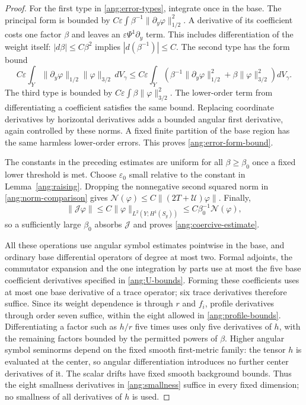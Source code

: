 \begin{proof}
For the first type in \eqref{ang:error-types}, integrate once in the
base.  The principal form is bounded by
$C\varepsilon\int\beta^{-1}\|\partial_y\varphi\|_{1/2}^2$.
A derivative of its coefficient costs one factor $\beta$ and leaves an
$\varepsilon\Psi^1\partial_y$ term.  This includes differentiation of the
weight itself: $|d\beta|\le C\beta^2$ implies
$|d(\beta^{-1})|\le C$.  The second type has the form bound
\[
 C\varepsilon\int_Y
     \|\partial_y\varphi\|_{1/2}\|\varphi\|_{3/2}\,dV_\gamma
 \le C\varepsilon\int_Y\left(
     \beta^{-1}\|\partial_y\varphi\|_{1/2}^2
                 +\beta\|\varphi\|_{3/2}^2\right)dV_\gamma.
\]
The third type is bounded by
$C\varepsilon\int\beta\|\varphi\|_{3/2}^2$.
The lower-order term from differentiating a coefficient satisfies the
same bound.  Replacing coordinate derivatives by horizontal derivatives
adds a bounded angular first derivative, again controlled by these norms.
A fixed finite partition of the base region has the same harmless
lower-order errors.  This proves \eqref{ang:error-form-bound}.

The constants in the preceding estimates are uniform for all
$\beta\ge\beta_0$ once a fixed lower threshold is met.  Choose
$\varepsilon_0$ small relative to the constant in
Lemma~\ref{ang:raising}.  Dropping the nonnegative second squared
norm in \eqref{ang:norm-comparison} gives
$\mathcal N(\varphi)\le C\|(2T+\mathcal U)\varphi\|$.
Finally,
\[
 \|\mathcal J\varphi\|\le C\|\varphi\|_{L^2(Y;H^1(S_y))}
                         \le C\beta_0^{-1}\mathcal N(\varphi),
\]
so a sufficiently large $\beta_0$ absorbs $\mathcal J$ and proves
\eqref{ang:coercive-estimate}.

All these operations use angular symbol estimates pointwise in the base,
and ordinary base differential operators of degree at most two.  Formal
adjoints, the commutator expansion and the one integration by parts use
at most the five base coefficient derivatives specified in
\eqref{ang:U-bounds}.  Forming these coefficients uses at most one base
derivative of a trace operator; six trace derivatives therefore suffice.
Since its weight dependence is through $r$ and $f_i$, profile derivatives
through order seven suffice, within the eight allowed in
\eqref{ang:profile-bounds}.  Differentiating a factor such as $h/r$ five
times uses only five derivatives of $h$, with the remaining factors
bounded by the permitted powers of $\beta$.  Higher angular symbol
seminorms depend on the fixed smooth first-metric family: the tensor $h$
is evaluated at the center, so angular differentiation introduces no
further center derivatives of it.  The scalar drifts have fixed smooth
background bounds.  Thus the eight smallness derivatives in
\eqref{ang:smallness} suffice in every fixed dimension; no smallness of
all derivatives of $h$ is used.
\end{proof}

